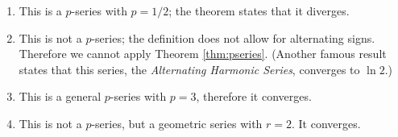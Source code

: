 \begin{example}
\begin{enumerate}
\item		This is a $p$-series with $p=1/2$; the theorem states that it diverges.

\item		This is not a $p$-series; the definition does not allow for alternating signs. Therefore we cannot apply Theorem \ref{thm:pseries}. (Another famous result states that this series, the \emph{Alternating Harmonic Series}, converges to $\ln 2$.)

\item		This is a general $p$-series with $p=3$, therefore it converges.

\item		This is not a $p$-series, but a geometric series with $r=2$. It converges.
\end{enumerate}
\end{example}